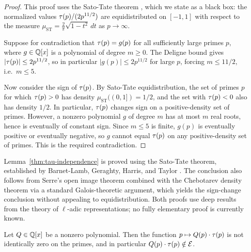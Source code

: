 \documentclass[11pt]{article}
\begin{document}
\begin{proof}
This proof uses the Sato-Tate theorem \cite{BLGHT2011}, which we state as a black box:
the normalized values $\tau(p)/(2p^{11/2})$ are equidistributed on $[-1,1]$ with respect
to the measure $\mu_{\mathrm{ST}}=\frac{2}{\pi}\sqrt{1-t^2}\,dt$ as $p\to\infty$.

Suppose for contradiction that $\tau(p)=g(p)$ for all sufficiently large primes $p$,
where $g\in\mathbb{Q}[x]$ is a polynomial of degree $m\ge 0$.
The Deligne bound \cite{Deligne1974} gives $|\tau(p)|\le 2p^{11/2}$, so in particular
$|g(p)|\le 2p^{11/2}$ for large $p$, forcing $m\le 11/2$, i.e.\ $m\le 5$.

Now consider the sign of $\tau(p)$.
By Sato-Tate equidistribution, the set of primes $p$ for which $\tau(p)>0$ has density
$\mu_{\mathrm{ST}}((0,1]) = 1/2$, and the set with $\tau(p)<0$ also has density $1/2$.
In particular, $\tau(p)$ changes sign on a positive-density set of primes.
However, a nonzero polynomial $g$ of degree $m$ has at most $m$ real roots, hence is
eventually of constant sign.
Since $m\le 5$ is finite, $g(p)$ is eventually positive or eventually negative, so $g$
cannot equal $\tau(p)$ on any positive-density set of primes.
This is the required contradiction.
\end{proof}

\begin{remark}
Lemma~\ref{thm:tau-independence} is proved using the Sato-Tate theorem, established by
Barnet-Lamb, Geraghty, Harris, and Taylor \cite{BLGHT2011}.
The conclusion also follows from Serre's open image theorem \cite{Serre1972} combined
with the Chebotarev density theorem via a standard Galois-theoretic argument, which
yields the sign-change conclusion without appealing to equidistribution.
Both proofs use deep results from the theory of $\ell$-adic representations; no fully
elementary proof is currently known.
\end{remark}

\begin{lemma}
\label{lem:no-poly-combo}
Let $Q\in\mathbb{Q}[x]$ be a nonzero polynomial.
Then the function $p\mapsto Q(p)\cdot\tau(p)$ is not identically zero on the primes,
and in particular $Q(p)\cdot\tau(p)\notin\mathcal{E}$.
\end{lemma}
\end{document}
